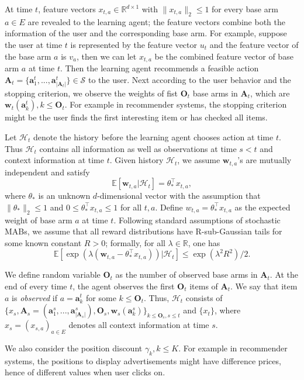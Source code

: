 \documentclass{article}
\newcommand{\EE}{\mathbb{E}}
\newcommand{\RR}{\mathbb{R}}
\newcommand{\bA}{\mathbf{A}}
\newcommand{\ba}{\mathbf{a}}
\newcommand{\bO}{\mathbf{O}}
\newcommand{\bw}{\mathbf{w}}
\newcommand{\cH}{\mathcal{H}}
\newcommand{\cS}{\mathcal{S}}
\newcommand{\abs}[1]{\left| #1 \right|}
\newcommand{\norm}[1]{\| #1 \|}
\begin{document}
At time $t$, feature vectors $x_{t,a} \in \RR^{d \times 1}$ with $\norm{x_{t,a}}_2 \leq 1$ for every base arm $a \in E$ are revealed to the learning agent; the feature vectors combine both the information of the user and the corresponding base arm. For example, suppose the user at time $t$ is represented by the feature vector $u_t$ and the feature vector of the base arm $a$ is $v_a$, then we can let $x_{t,a}$ be the combined feature vector of base arm $a$ at time $t$. Then the learning agent recommends a feasible action $\bA_t=\{ \ba_{1}^t,...,\ba_{\abs{\bA_t}}^t \} \in \cS$ to the user. Next according to the user behavior and the stopping criterion, we observe the weights of fist $\bO_t$ base arms in $\bA_t$, which are $\bw_t(\ba_k^t), k \leq \bO_t$. For example in recommender systems, the stopping criterion might be the user finds the first interesting item or has checked all items.

Let $\cH_t$ denote the history before the learning agent chooses action at time $t$. Thus $\cH_t$ contains all information as well as observations at time $s < t$ and context information at time $t$. Given history $\cH_t$, we assume $\bw_{t,a}$'s are mutually independent and satisfy
\begin{equation} %
  \label{eq:expectation}
  \EE[\bw_{t,a} | \cH_t] = \theta_{\ast}^{\top} x_{t,a},
\end{equation}
where $\theta_{\ast}$ is an unknown $d$-dimensional vector with the assumption that $\norm{\theta_{\ast}}_2 \leq 1$ and $0 \leq \theta_{\ast}^{\top} x_{t,a} \leq 1$ for all $t, a$. Define $w_{t,a} = \theta_{\ast}^{\top} x_{t,a}$ as the expected weight of base arm $a$ at time $t$. Following standard assumptions of stochastic MABs, we assume that all reward distributions have R-sub-Gaussian tails for some known constant $R > 0$; formally, for all $\lambda \in \RR$, one has 
$$
\EE[\exp(\lambda(\bw_{t,a} - \theta_{\ast}^{\top} x_{t,a})) | \cH_t] \leq \exp(\lambda^2 R^2)/2.
$$

We define random variable $\bO_t$ as the number of observed base arms in $\bA_t$. At the end of every time $t$, the agent observes the first $\bO_t$ items of $\bA_t$. We say that item $a$ is {\it observed} if $a = \ba_k^t$ for some $k \leq \bO_t$. Thus, $\cH_t$ consists of $\{x_s, \bA_s = (\ba_{1}^s,...,\ba_{\abs{\bA_s}}^s), \bO_s, \bw_s(\ba_k^s) \}_{k\leq \bO_s, s\leq t}$ and $\{x_t\}$, where $x_s = (x_{s,a})_{a \in E}$ denotes all context information at time $s$.

We also consider the position discount $\gamma_k, k\leq K$. For example in recommender systems, the positions to display advertisements might have difference prices, hence of different values when user clicks on.
\end{document}
